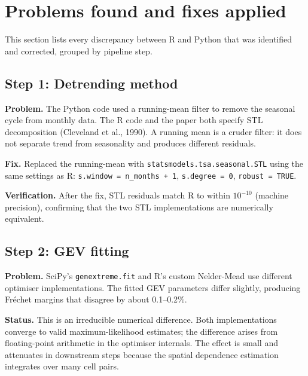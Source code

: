 \documentclass[12pt,a4paper]{article}
\begin{document}
\section{Problems found and fixes applied}

This section lists every discrepancy between R and Python that was
identified and corrected, grouped by pipeline step.

\subsection{Step 1: Detrending method}
\label{sec:fix-stl}

\textbf{Problem.}
The Python code used a running-mean filter to remove the seasonal
cycle from monthly data.  The R code and the paper both specify
STL decomposition (Cleveland et al., 1990).  A running mean is a
cruder filter: it does not separate trend from seasonality and
produces different residuals.

\textbf{Fix.}
Replaced the running-mean with \texttt{statsmodels.tsa.seasonal.STL}
using the same settings as R:
\texttt{s.window = n\_months + 1}, \texttt{s.degree = 0},
\texttt{robust = TRUE}.

\textbf{Verification.}
After the fix, STL residuals match R to within $10^{-10}$ (machine
precision), confirming that the two STL implementations are
numerically equivalent.

\subsection{Step 2: GEV fitting}
\label{sec:fix-gev}

\textbf{Problem.}
SciPy's \texttt{genextreme.fit} and R's custom Nelder-Mead use
different optimiser implementations.  The fitted GEV parameters
differ slightly, producing Fr\'echet margins that disagree by
about 0.1--0.2\%.

\textbf{Status.}
This is an irreducible numerical difference.  Both implementations
converge to valid maximum-likelihood estimates; the difference arises
from floating-point arithmetic in the optimiser internals.  The effect
is small and attenuates in downstream steps because the spatial
dependence estimation integrates over many cell pairs.
\end{document}
